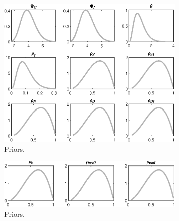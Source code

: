 \begin{figure}[H]
\centering
\includegraphics[width=0.80\textwidth]{BRS_sectoral_artificial_data/graphs/BRS_sectoral_artificial_data_Priors4}
\caption{Priors.}\label{Fig:Priors:4}
\end{figure}
\begin{figure}[H]
\centering
\includegraphics[width=0.80\textwidth]{BRS_sectoral_artificial_data/graphs/BRS_sectoral_artificial_data_Priors5}
\caption{Priors.}\label{Fig:Priors:5}
\end{figure}
 

